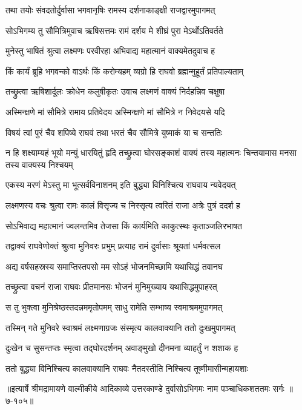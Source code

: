 
\twolineshloka
{तथा तयोः संवदतोर्दुर्वासा भगवानृषिः}
{रामस्य दर्शनाकाङ्क्षी राजद्वारमुपागमत्} %

\twolineshloka
{सोऽभिगम्य तु सौमित्रिमुवाच ऋषिसत्तमः}
{रामं दर्शय मे शीघ्रं पुरा मेऽर्थोऽतिवर्तते} %

\twolineshloka
{मुनेस्तु भाषितं श्रुत्वा लक्ष्मणः परवीरहा}
{अभिवाद्य महात्मानं वाक्यमेतदुवाच ह} %

\twolineshloka
{किं कार्यं ब्रूहि भगवन्को वाऽर्थः किं करोम्यहम्}
{व्यग्रो हि राघवो ब्रह्मन्मुहूर्तं प्रतिपाल्यताम्} %

\twolineshloka
{तच्छ्रुत्वा ऋषिशार्दूलः क्रोधेन कलुषीकृतः}
{उवाच लक्ष्मणं वाक्यं निर्दहन्निव चक्षुषा} %

\twolineshloka
{अस्मिन्क्षणे मां सौमित्रे रामाय प्रतिवेदय}
{अस्मिन्क्षणे मां सौमित्रे न निवेदयसे यदि} %

\twolineshloka
{विषयं त्वां पुरं चैव शपिष्ये राघवं तथा}
{भरतं चैव सौमित्रे युष्माकं या च सन्ततिः} %

\threelineshloka
{न हि शक्ष्याम्यहं भूयो मन्युं धारयितुं हृदि}
{तच्छ्रुत्वा घोरसङ्काशं वाक्यं तस्य महात्मनः}
{चिन्तयामास मनसा तस्य वाक्यस्य निश्चयम्} %

\twolineshloka
{एकस्य मरणं मेऽस्तु मा भूत्सर्वविनाशनम्}
{इति बुद्ध्या विनिश्चित्य राघवाय न्यवेदयत्} %

\twolineshloka
{लक्ष्मणस्य वचः श्रुत्वा रामः कालं विसृज्य च}
{निस्सृत्य त्वरितं राजा अत्रेः पुत्रं ददर्श ह} %

\twolineshloka
{सोऽभिवाद्य महात्मानं ज्वलन्तमिव तेजसा}
{किं कार्यमिति काकुत्स्थः कृताञ्जलिरभाषत} %

\twolineshloka
{तद्वाक्यं राघवेणोक्तं श्रुत्वा मुनिवरः प्रभुम्}
{प्रत्याह रामं दुर्वासाः श्रूयतां धर्मवत्सल} %

\twolineshloka
{अद्य वर्षसहस्रस्य समाप्तिस्तपसो मम}
{सोऽहं भोजनमिच्छामि यथासिद्धं तवानघ} %

\twolineshloka
{तच्छ्रुत्वा वचनं राजा राघवः प्रीतमानसः}
{भोजनं मुनिमुख्याय यथासिद्धमुपाहरत्} %

\twolineshloka
{स तु भुक्त्वा मुनिश्रेष्ठस्तदन्नममृतोपमम्}
{साधु रामेति सम्भाष्य स्वमाश्रममुपागमत्} %

\twolineshloka
{तस्मिन् गते मुनिवरे स्वाश्रमं लक्ष्मणाग्रजः}
{संस्मृत्य कालवाक्यानि ततो दुःखमुपागमत्} %

\twolineshloka
{दुःखेन च सुसन्तप्तः स्मृत्वा तद्घोरदर्शनम्}
{अवाङ्मुखो दीनमना व्याहर्तुं न शशाक ह} %

\twolineshloka
{ततो बुद्ध्या विनिश्चित्य कालवाक्यानि राघवः}
{नैतदस्तीति निश्चित्य तूष्णीमासीन्महायशाः} %


॥इत्यार्षे श्रीमद्रामायणे वाल्मीकीये आदिकाव्ये उत्तरकाण्डे दुर्वासोऽभिगमः नाम पञ्चाधिकशततमः सर्गः ॥७-१०५॥
